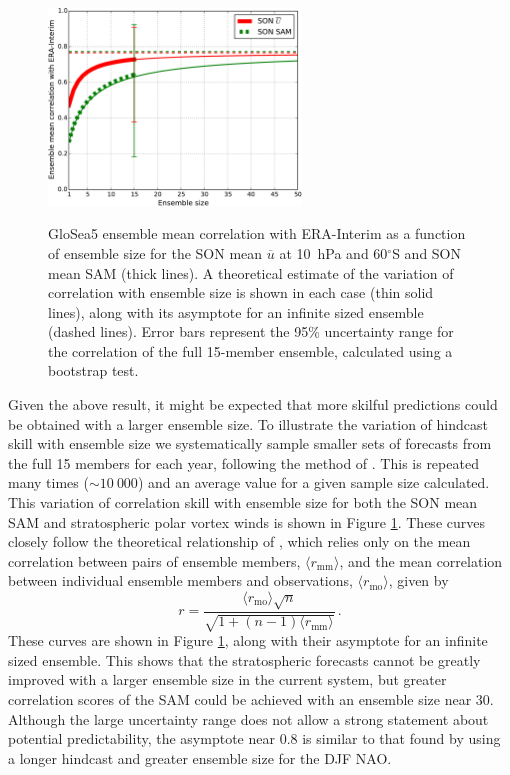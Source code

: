 \begin{figure}[t]
  \centering
  \noindent\includegraphics[width=0.6\textwidth,angle=0]{figures/chapter-seasonal/corr_ens_size_crop.pdf}\\
  \caption[Variation of GloSea5 forecast skill with ensemble size]{GloSea5
    ensemble mean correlation with ERA-Interim as a function of ensemble size
    for the SON mean $\overline{u}$ at 10~hPa and 60$^{\circ}$S and SON mean SAM
    (thick lines). A theoretical estimate of the variation of correlation with
    ensemble size is shown in each case (thin solid lines), along with its
    asymptote for an infinite sized ensemble (dashed lines). Error bars
    represent the 95\% uncertainty range for the correlation of the full
    15-member ensemble, calculated using a bootstrap
    test.}\label{fig:corr_ens_size_sh}
\end{figure}

Given the above result, it might be expected that more skilful predictions could
be obtained with a larger ensemble size. To illustrate the variation of hindcast
skill with ensemble size we systematically sample smaller sets of forecasts from
the full 15 members for each year, following the method of
\citet{Scaife2013}. This is repeated many times ($\sim 10~000$) and an average
value for a given sample size calculated. This variation of correlation skill
with ensemble size for both the SON mean SAM and stratospheric polar vortex
winds is shown in Figure \ref{fig:corr_ens_size_sh}. These curves closely follow
the theoretical relationship of \citet{Murphy1990}, which relies only on the
mean correlation between pairs of ensemble members, $\langle r_{\mathrm{mm}} \rangle$,
and the mean correlation between individual ensemble members and observations,
$\langle r_{\mathrm{mo}} \rangle$, given by
\begin{equation}
  r = \frac{\langle r_{\mathrm{mo}} \rangle \sqrt{n}}{\sqrt{1+(n-1)\langle r_{\mathrm{mm}} \rangle}}
  \, .
\end{equation} 
These curves are shown in Figure \ref{fig:corr_ens_size_sh}, along with their
asymptote for an infinite sized ensemble. This shows that the stratospheric
forecasts cannot be greatly improved with a larger ensemble size in the current
system, but greater correlation scores of the SAM could be achieved with an
ensemble size near 30. Although the large uncertainty range does not allow a
strong statement about potential predictability, the asymptote near 0.8 is
similar to that found by \citet{Scaife2013} using a longer hindcast and greater
ensemble size for the DJF NAO.

